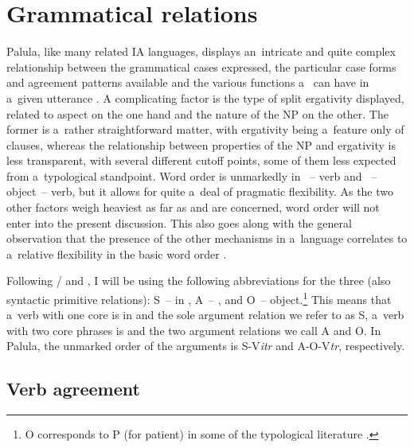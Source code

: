 \chapter{Grammatical relations}
\label{chap:11}

Palula, like many related IA languages, displays an~intricate and quite complex relationship between the grammatical cases expressed, the particular case forms and agreement patterns available and the various functions a~  can have in a~given utterance \citep[230--231]{masica1991}. A complicating factor is the type of split ergativity displayed, related to aspect on the one hand and the nature of the NP on the other. The former is a~rather straightforward matter, with ergativity being a~feature only of  clauses, whereas the relationship between properties of the NP and ergativity is less transparent, with several different cutoff points, some of them less expected from a~typological standpoint. Word order is unmarkedly in ~-- verb and  ~-- object~-- verb, but it allows for quite a~deal of pragmatic flexibility. As the two other factors weigh heaviest as far as  and  are concerned, word order will not enter into the present discussion. This also goes along with the general observation that the presence of the other mechanisms in a~language correlates to a~relative flexibility in the basic word order \citep[14--15]{blake2001}.



Following \citet[6--8]{dixon1994}/\citet[76--77]{dixon2010} and \citet[402]{bickel2011}, I will be using the following abbreviations for the three  (also syntactic primitive relations): S~-- in , A~--  , and O~--  object.\footnote{O corresponds to P (for patient) in some of the typological literature \citep{comrie1989,croft2003}.\par } This means that a~verb with one core   is in and the sole argument relation we refer to as S, a~verb with two core  phrases is  and the two argument relations we call A and O. In Palula, the unmarked order of the arguments is S-V\textit{itr} and A-O-V\textit{tr}, respectively.


\section{Verb agreement}
\label{sec:11-1}

